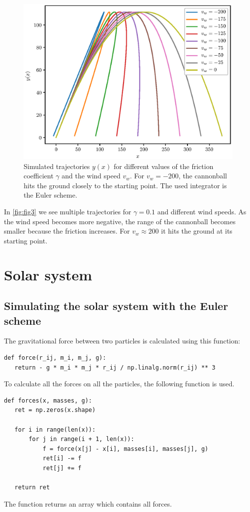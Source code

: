 \documentclass[a4paper,10pt,bibtotoc]{scrartcl}
\begin{document}
\begin{figure}[t]
 \includegraphics{Figure_3.eps}
 \caption{Simulated trajectories $y(x)$ for different values of the friction coefficient $\gamma$ and the wind speed $v_w$. For $v_w= -200$, the cannonball hits the ground closely to the starting point. The used integrator is the Euler scheme.}
 \label{fig:fig3}
\end{figure}

In \autoref{fig:fig3} we see multiple trajectories for $\gamma=0.1$ and different wind speeds. As the wind speed becomes more negative, the range of the cannonball becomes smaller because the friction increases. For $v_w\approx 200$ it hits the ground at its starting point.



\section{Solar system}
\subsection{Simulating the solar system with the Euler scheme}
The gravitational force between two particles is calculated using this function:
\begin{lstlisting}
def force(r_ij, m_i, m_j, g):
   return - g * m_i * m_j * r_ij / np.linalg.norm(r_ij) ** 3
\end{lstlisting}
To calculate all the forces on all the particles, the following function is used.
\begin{lstlisting}
def forces(x, masses, g):
   ret = np.zeros(x.shape)

   for i in range(len(x)):
       for j in range(i + 1, len(x)):
           f = force(x[j] - x[i], masses[i], masses[j], g)
           ret[i] -= f
           ret[j] += f

   return ret
\end{lstlisting}
The function returns an array which contains all forces. 
\end{document}
